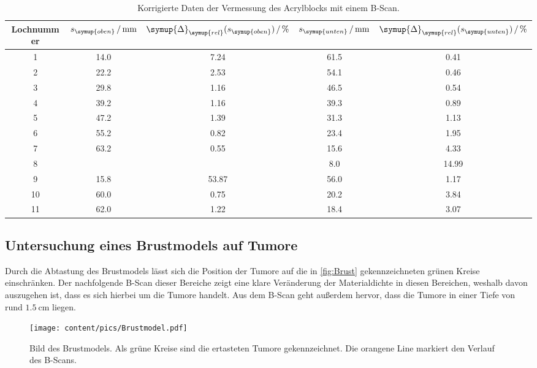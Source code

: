   \begin{table}[H]
    \centering
    \caption{Korrigierte Daten der Vermessung des Acrylblocks mit einem B-Scan.}
    \label{tab:b-scan_korr}
    \begin{tabular}{S[table-format=2.0] S[table-format=2.1] S[table-format=2.2] S[table-format=2.1] S[table-format=2.2]}
        \toprule
         {Lochnummer} & {$s_{\symup{oben}}\,/\,\unit{\milli\metre}$} & {$\symup{\Delta}_{\symup{rel}}(s_{\symup{oben}})\,/\,\unit{\percent}$} & %
         {$s_{\symup{unten}}\,/\,\unit{\milli\metre}$} & {$\symup{\Delta}_{\symup{rel}}(s_{\symup{unten}})\,/\,\unit{\percent}$} \\
        	& 14.0 &  7.24 & 61.5 &  0.41 \\
         2	& 22.2 &  2.53 & 54.1 &  0.46 \\
         3	& 29.8 &  1.16 & 46.5 &  0.54 \\
         4	& 39.2 &  1.16 & 39.3 &  0.89 \\
         5	& 47.2 &  1.39 & 31.3 &  1.13 \\
         6	& 55.2 &  0.82 & 23.4 &  1.95 \\
         7	& 63.2 &  0.55 & 15.6 &  4.33 \\
         8	&  {}  &  {}   &  8.0 & 14.99 \\
         9	& 15.8 & 53.87 & 56.0 &  1.17 \\
         10	& 60.0 &  0.75 & 20.2 &  3.84 \\
         11	& 62.0 &  1.22 & 18.4 &  3.07 \\
        \bottomrule 
    \end{tabular}
  \end{table}
  
  \subsection{Untersuchung eines Brustmodels auf Tumore}
  Durch die Abtastung des Brustmodels lässt sich die Position der Tumore auf die in \autoref{fig:Brust} gekennzeichneten grünen Kreise einschränken.
  Der nachfolgende B-Scan dieser Bereiche zeigt eine klare Veränderung der Materialdichte in diesen Bereichen, weshalb davon auszugehen ist, dass
  es sich hierbei um die Tumore handelt. Aus dem B-Scan geht außerdem hervor, dass die Tumore in einer Tiefe von rund $\qty{1,5}{\centi\metre}$ liegen.
  \begin{figure}[H]
    \centering
    \texttt{[image: content/pics/Brustmodel.pdf]}
    \caption{Bild des Brustmodels. Als grüne Kreise sind die ertasteten Tumore gekennzeichnet. Die orangene Line markiert den Verlauf des B-Scans.}
    \label{fig:Brust}
  \end{figure}

